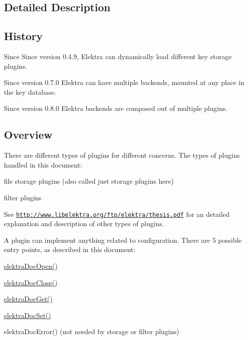 \subsection{Detailed Description}
\hypertarget{group__plugin_history}{}\subsection{History}\label{group__plugin_history}
\begin{DoxySince}{Since}
Since version 0.4.9, Elektra can dynamically load different key storage plugins.

Since version 0.7.0 Elektra can have multiple backends, mounted at any place in the key database.

Since version 0.8.0 Elektra backends are composed out of multiple plugins.
\end{DoxySince}
\hypertarget{index_overview}{}\subsection{Overview}\label{index_overview}
There are different types of plugins for different concerns. The types of plugins handled in this document:
\begin{DoxyItemize}
\item file storage plugins (also called just storage plugins here)
\item filter plugins
\end{DoxyItemize}

See \href{http://www.libelektra.org/ftp/elektra/thesis.pdf}{\tt http://www.libelektra.org/ftp/elektra/thesis.pdf} for an detailed explanation and description of other types of plugins.

A plugin can implement anything related to configuration. There are 5 possible entry points, as described in this document:
\begin{DoxyItemize}
\item \hyperlink{group__plugin_ga1e2cbea1275fc0d39a00a74eb69e12d8}{elektraDocOpen()}
\item \hyperlink{group__plugin_gafb66a15abe15f79c9c5b3a928b42147d}{elektraDocClose()}
\item \hyperlink{group__plugin_gacb69f3441c6d84241b4362f958fbe313}{elektraDocGet()}
\item \hyperlink{group__plugin_gae65781a1deb34efc79c8cb9d9174842c}{elektraDocSet()}
\item elektraDocError() (not needed by storage or filter plugins)
\end{DoxyItemize}

